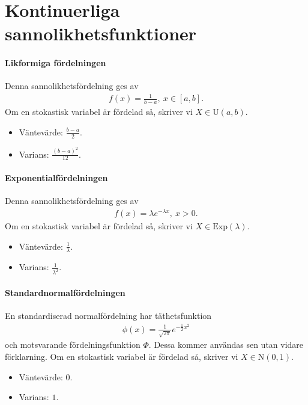 \section{Kontinuerliga sannolikhetsfunktioner}

\paragraph{Likformiga fördelningen}
Denna sannolikhetsfördelning ges av
\begin{align*}
	f(x) = \frac{1}{b - a},\ x\in [a, b].
\end{align*}
Om en stokastisk variabel är fördelad så, skriver vi $X\in\text{U}(a,b)$.

\begin{itemize}
	\item Väntevärde: $\frac{b - a}{2}$.
	\item Varians: $\frac{(b - a)^2}{12}$.
\end{itemize}

\paragraph{Exponentialfördelningen}
Denna sannolikhetsfördelning ges av
\begin{align*}
	f(x) = \lambda e^{-\lambda x},\ x > 0.
\end{align*}
Om en stokastisk variabel är fördelad så, skriver vi $X\in\text{Exp}(\lambda)$.

\begin{itemize}
	\item Väntevärde: $\frac{1}{\lambda}$.
	\item Varians: $\frac{1}{\lambda^2}$.
\end{itemize}

\paragraph{Standardnormalfördelningen}
En standardiserad normalfördelning har täthetsfunktion
\begin{align*}
	\phi(x) = \frac{1}{\sqrt{2\pi}}e^{-\frac{1}{2}x^2}
\end{align*}
och motsvarande fördelningsfunktion $\Phi$. Dessa kommer användas sen utan vidare förklarning. Om en stokastisk variabel är fördelad så, skriver vi $X\in\text{N}(0,1)$.

\begin{itemize}
	\item Väntevärde: $0$.
	\item Varians: $1$.
\end{itemize}

